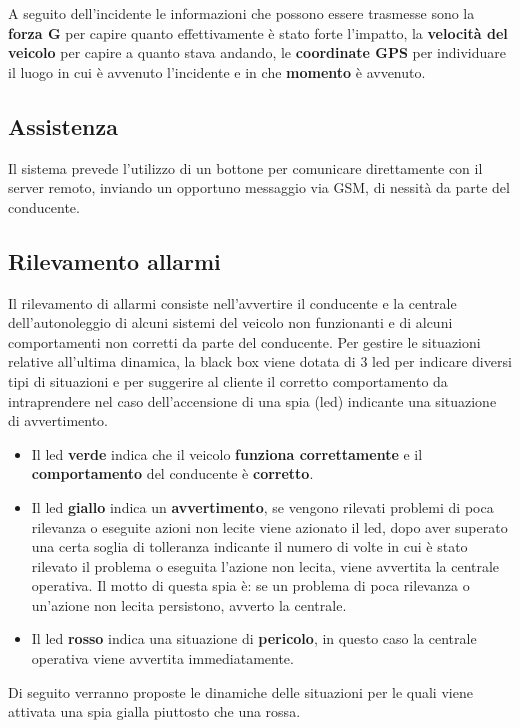 \documentclass[12pt, a4paper, italian]{report}
\numberwithin{figure}{chapter}
\numberwithin{table}{chapter}
\begin{document}
A seguito dell'incidente le informazioni che possono essere trasmesse sono la \textbf{forza G} per capire quanto effettivamente è stato forte l'impatto, la \textbf{velocità del veicolo} per capire a quanto stava andando, le \textbf{coordinate GPS} per individuare il luogo in cui è avvenuto l'incidente e in che \textbf{momento} è avvenuto.

\subsection{Assistenza}
Il sistema prevede l'utilizzo di un bottone per comunicare direttamente con il server remoto, inviando un opportuno messaggio via GSM, di nessità da parte del conducente.
\subsection{Rilevamento allarmi}
Il rilevamento di allarmi consiste nell'avvertire il conducente e la centrale dell'autonoleggio di alcuni sistemi del veicolo non funzionanti e di alcuni comportamenti non corretti da parte del conducente. Per gestire le situazioni relative all'ultima dinamica, la black box viene dotata di 3 led per indicare diversi tipi di situazioni e per suggerire al cliente il corretto comportamento da intraprendere nel caso dell'accensione di una spia (led) indicante una situazione di avvertimento. 
\begin{itemize}
    \item Il led \textbf{verde} indica che il veicolo \textbf{funziona correttamente} e il \textbf{comportamento} del conducente è \textbf{corretto}.
    \item Il led \textbf{giallo} indica un \textbf{avvertimento}, se vengono rilevati problemi di poca rilevanza o eseguite azioni non lecite viene azionato il led, dopo aver superato una certa soglia di tolleranza indicante il numero di volte in cui è stato rilevato il problema o eseguita l'azione non lecita, viene avvertita la centrale operativa. Il motto di questa spia è: se un problema di poca rilevanza o un'azione non lecita persistono, avverto la centrale.
    \item Il led \textbf{rosso} indica una situazione di \textbf{pericolo}, in questo caso la centrale operativa viene avvertita immediatamente.
\end{itemize}

Di seguito verranno proposte le dinamiche delle situazioni per le quali viene attivata una spia gialla piuttosto che una rossa.
\end{document}
